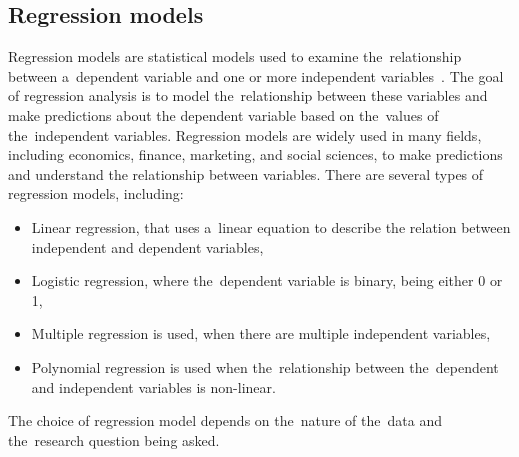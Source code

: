         \subsection{Regression models}
        Regression models are  statistical models used to examine the~relationship
        between a~dependent variable and one or more independent variables~\cite{Fahrmeir}.
        The goal of regression analysis is to model the~relationship between these variables
        and make predictions about the dependent variable based on the~values of
        the~independent variables. Regression models are widely used in many fields,
        including economics, finance, marketing, and social sciences, to make predictions
        and understand the relationship between variables. There are several types of
        regression models, including:
        \begin{itemize}
            \item Linear regression, that uses a~linear equation to describe the relation between independent and dependent variables,
            \item Logistic regression, where
            the~dependent variable is binary, being either 0 or 1,
            \item Multiple regression is used, when there are multiple independent variables,
            \item Polynomial regression is used when the~relationship between the~dependent and independent variables
            is non-linear.
        \end{itemize}

        The choice of regression model depends on the~nature of the~data and
        the~research question being asked.
        
